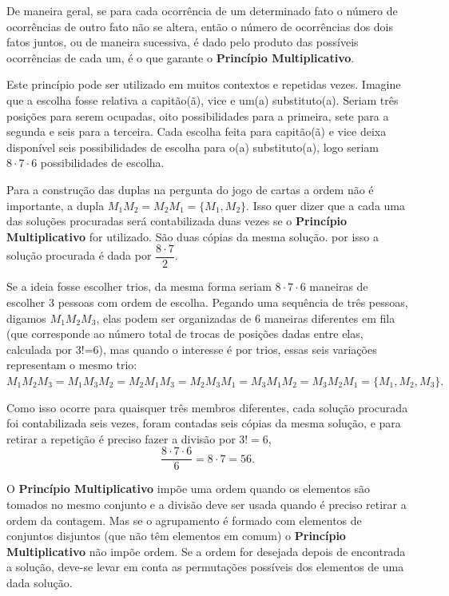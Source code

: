 De maneira geral,  se para cada ocorrência de um determinado fato o número de ocorrências de outro fato não se altera, então o número de ocorrências dos dois fatos juntos, ou de maneira sucessiva,  é dado pelo produto das possíveis ocorrências de cada um, é o que garante o \textbf{Princípio Multiplicativo}. 

Este princípio pode ser utilizado em muitos contextos e repetidas vezes. Imagine que a escolha fosse relativa a capitão(ã), vice e um(a) substituto(a). Seriam três posições para serem ocupadas, oito possibilidades para a primeira, sete para a segunda e seis para a terceira. Cada escolha feita para capitão(ã) e vice deixa disponível seis possibilidades de escolha para o(a) substituto(a), logo seriam $8\cdot 7 \cdot 6$ possibilidades de escolha.

Para a construção das duplas na pergunta do jogo de cartas a ordem não é importante, a dupla $M_1M_2 = M_2M_1 = \{M_1,M_{2}\}$. Isso quer dizer que a cada uma das soluções procuradas será contabilizada duas vezes se o \textbf{Princípio Multiplicativo} for utilizado. São duas cópias da mesma solução. por isso a solução procurada é dada por $\dfrac{8 \cdot 7}{2}$.

 Se a ideia fosse escolher trios, da mesma forma seriam $8\cdot 7 \cdot 6$ maneiras de escolher 3 pessoas com ordem de escolha. Pegando uma sequência de três pessoas, digamos $M_1M_2M_3$, elas podem ser organizadas de 6 maneiras diferentes em fila (que corresponde ao número total de trocas de posições dadas entre elas, calculada por 3!=6), mas quando o interesse é por trios, essas seis variações representam o mesmo trio: $M_1M_2M_3=M_1M_3M_2=M_2M_1M_3=M_2M_3M_1=M_3M_1M_2=M_3M_2M_1=\{M_1,M_{2},M_{3}\}.$
 
 Como isso  ocorre para quaisquer três membros diferentes, cada solução procurada foi contabilizada seis vezes, foram contadas seis cópias da mesma solução, e para retirar a repetição é preciso fazer a divisão por $3!=6$, $$\dfrac{8 \cdot 7 \cdot 6}{6} = 8 \cdot 7 = 56.$$

O \textbf{Princípio Multiplicativo} impõe uma ordem quando os elementos são tomados no mesmo conjunto e a divisão deve ser usada quando é preciso retirar a ordem da contagem. Mas se o agrupamento é formado com elementos de conjuntos disjuntos (que não têm elementos em comum) o \textbf{Princípio Multiplicativo} não impõe ordem. Se a ordem for desejada depois de encontrada a solução, deve-se levar em conta as permutações possíveis dos elementos de uma dada solução. 

